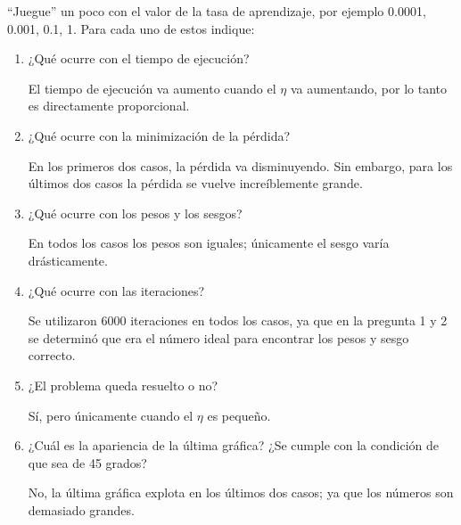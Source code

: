 \begin{problema}
	“Juegue” un poco con el valor de la tasa de aprendizaje, por ejemplo  0.0001, 0.001, 0.1, 1.  Para cada uno de estos indique:
	\begin{enumerate}
		\item ¿Qué ocurre con el tiempo de ejecución?
		\begin{sol}
			El tiempo de ejecución va aumento cuando el $\eta$ va aumentando, por lo tanto es directamente proporcional. 
		\end{sol}
		\item ¿Qué ocurre con la minimización de la pérdida?
		\begin{sol}
			En los primeros dos casos, la pérdida va disminuyendo. Sin embargo, para los últimos dos casos la pérdida se vuelve increíblemente grande.
		\end{sol}
		\item ¿Qué ocurre con los pesos y los sesgos?
			\begin{sol}
			En todos los casos los pesos son iguales; únicamente el sesgo varía drásticamente. 
		\end{sol}
		\item ¿Qué ocurre con las iteraciones?
			\begin{sol}
			Se utilizaron 6000 iteraciones en todos los casos, ya que en la pregunta 1 y 2 se determinó que era el número ideal para encontrar los pesos y sesgo correcto. 
		\end{sol}
		\item ¿El problema queda resuelto o no?  
			\begin{sol}
			Sí, pero únicamente cuando el $\eta$ es pequeño. 
		\end{sol}
		\item ¿Cuál es la apariencia de la última gráfica?  ¿Se cumple con la condición de que sea de 45 grados?
			\begin{sol}
			No, la última gráfica explota en los últimos dos casos; ya que los números son demasiado grandes. 
		\end{sol}
	\end{enumerate}
	
\end{problema}

